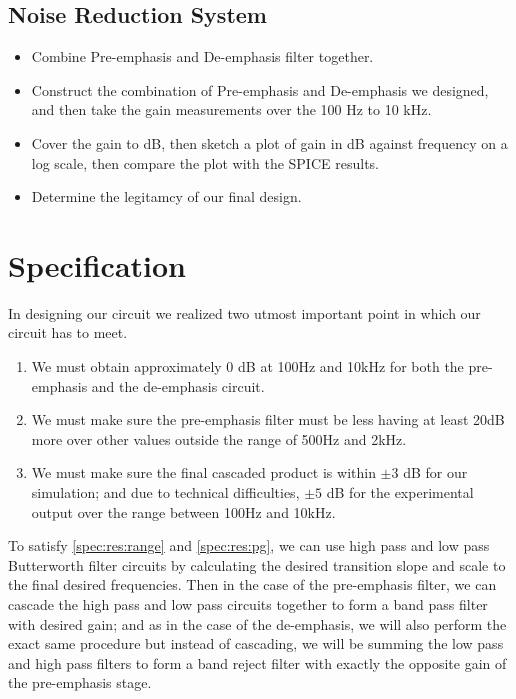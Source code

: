 \documentclass[report]{IEEEtran}
\begin{document}
		\subsection{Noise Reduction System}
			\begin{itemize}
				\item{Combine Pre-emphasis and De-emphasis filter together. }
				\item{Construct the combination of Pre-emphasis and De-emphasis we designed, and then take the gain measurements over the 100 Hz to 10 kHz.}
				\item{Cover the gain to dB, then sketch a plot of gain in dB against frequency on a log scale, then compare the plot with the SPICE results.}
				\item{Determine the legitamcy of our final design.}
			\end{itemize}
	
	\section{Specification}
		In designing our circuit we realized two utmost important point in which our circuit has to meet.
		\begin{enumerate}
			\item \label{spec:res:range} We must obtain approximately 0 dB at 100Hz and 10kHz for both the pre-emphasis and the de-emphasis circuit.
			\item \label{spec:res:pg} We must make sure the pre-emphasis filter must be less having at least 20dB more over other values outside the range of 500Hz and 2kHz.
			\item \label{spec:res:output} We must make sure the final cascaded product is within $\pm 3$ dB for our simulation; and due to technical difficulties, $\pm 5$ dB for the experimental output over the range between 100Hz and 10kHz.
		\end{enumerate}
		
		To satisfy \ref{spec:res:range} and \ref{spec:res:pg}, we can use high pass and low pass Butterworth filter circuits by calculating the desired transition slope and scale to the final desired frequencies. Then in the case of the pre-emphasis filter, we can cascade the high pass and low pass circuits together to form a band pass filter with desired gain; and as in the case of the de-emphasis, we will also perform the exact same procedure but instead of cascading, we will be summing the low pass and high pass filters to form a band reject filter with exactly the opposite gain of the pre-emphasis stage.
		
\end{document}
